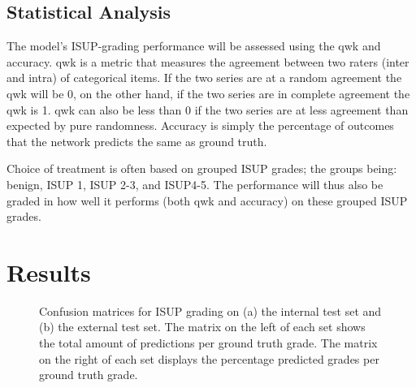 \documentclass{mod-comjnl}
\begin{document}
\subsection{Statistical Analysis}
The model's ISUP-grading performance will be assessed using the \acrfull{qwk} and accuracy. \acrshort{qwk} is a metric that measures the agreement between two raters (inter and intra) of categorical items. If the two series are at a random agreement the \acrshort{qwk} will be 0, on the other hand, if the two series are in complete agreement the \acrshort{qwk} is 1. \acrshort{qwk} can also be less than 0 if the two series are at less agreement than expected by pure randomness. Accuracy is simply the percentage of outcomes that the network predicts the same as ground truth.

Choice of treatment is often based on grouped ISUP grades; the groups being: benign, ISUP 1, ISUP 2-3, and ISUP4-5. The performance will thus also be graded in how well it performs (both \acrshort{qwk} and accuracy) on these grouped ISUP grades.

\section{Results}
\begin{figure*}[t]
  \hspace{-2cm}
  \centering
  \begin{subfigure}[b]{.5\linewidth}
    \centering
    \begin{subfigure}[b]{.5\linewidth}
      \centering
      \resizebox{1.5\textwidth}{!}{}
    \end{subfigure}%
    \begin{subfigure}[b]{.5\linewidth}
      \centering
      \resizebox{1.5\textwidth}{!}{}
    \end{subfigure}%
    \caption{}
  \end{subfigure}%
  \begin{subfigure}[b]{.5\linewidth}
    \centering
    \begin{subfigure}[b]{.5\linewidth}
      \centering
      \resizebox{1.5\textwidth}{!}{}
    \end{subfigure}%
    \begin{subfigure}[b]{.5\linewidth}
      \centering
      \resizebox{1.5\textwidth}{!}{}
    \end{subfigure}%
    \caption{}
  \end{subfigure}%
  \caption{Confusion matrices for ISUP grading on (a) the internal test set and (b) the external test set. The matrix on the left of each set shows the total amount of predictions per ground truth grade. The matrix on the right of each set displays the percentage predicted grades per ground truth grade.}
  \label{fig:heatmaps}
\end{figure*}
\end{document}
